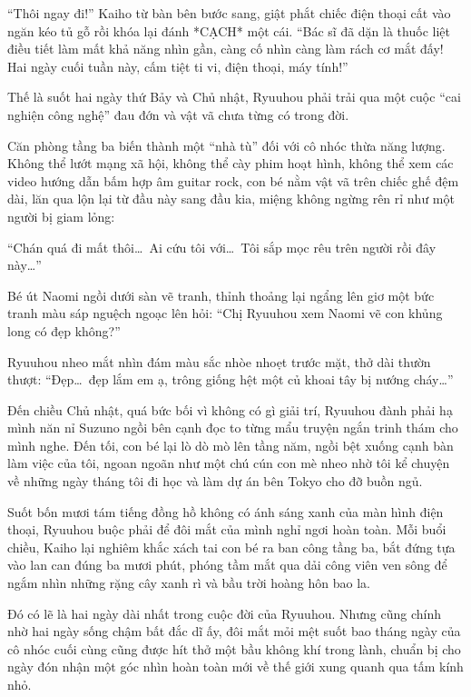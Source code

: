 ﻿\documentclass[../main.tex]{subfiles}
\begin{document}
``Thôi ngay đi!'' Kaiho từ bàn bên bước sang, giật phắt chiếc điện thoại cất vào ngăn kéo tủ gỗ rồi khóa lại đánh *CẠCH* một cái. ``Bác sĩ đã dặn là thuốc liệt điều tiết làm mất khả năng nhìn gần, càng cố nhìn càng làm rách cơ mắt đấy! Hai ngày cuối tuần này, cấm tiệt ti vi, điện thoại, máy tính!''

Thế là suốt hai ngày thứ Bảy và Chủ nhật, Ryuuhou phải trải qua một cuộc ``cai nghiện công nghệ'' đau đớn và vật vã chưa từng có trong đời.

Căn phòng tầng ba biến thành một ``nhà tù'' đối với cô nhóc thừa năng lượng. Không thể lướt mạng xã hội, không thể cày phim hoạt hình, không thể xem các video hướng dẫn bấm hợp âm guitar rock, con bé nằm vật vã trên chiếc ghế đệm dài, lăn qua lộn lại từ đầu này sang đầu kia, miệng không ngừng rên rỉ như một người bị giam lỏng:

``Chán quá đi mất thôi\dots\ Ai cứu tôi với\dots\ Tôi sắp mọc rêu trên người rồi đây này\dots''

Bé út Naomi ngồi dưới sàn vẽ tranh, thỉnh thoảng lại ngẩng lên giơ một bức tranh màu sáp nguệch ngoạc lên hỏi: ``Chị Ryuuhou xem Naomi vẽ con khủng long có đẹp không?''

Ryuuhou nheo mắt nhìn đám màu sắc nhòe nhoẹt trước mặt, thở dài thườn thượt: ``Đẹp\dots\ đẹp lắm em ạ, trông giống hệt một củ khoai tây bị nướng cháy\dots''

Đến chiều Chủ nhật, quá bức bối vì không có gì giải trí, Ryuuhou đành phải hạ mình năn nỉ Suzuno ngồi bên cạnh đọc to từng mẩu truyện ngắn trinh thám cho mình nghe. Đến tối, con bé lại lò dò mò lên tầng năm, ngồi bệt xuống cạnh bàn làm việc của tôi, ngoan ngoãn như một chú cún con mè nheo nhờ tôi kể chuyện về những ngày tháng tôi đi học và làm dự án bên Tokyo cho đỡ buồn ngủ.

Suốt bốn mươi tám tiếng đồng hồ không có ánh sáng xanh của màn hình điện thoại, Ryuuhou buộc phải để đôi mắt của mình nghỉ ngơi hoàn toàn. Mỗi buổi chiều, Kaiho lại nghiêm khắc xách tai con bé ra ban công tầng ba, bắt đứng tựa vào lan can đúng ba mươi phút, phóng tầm mắt qua dải công viên ven sông để ngắm nhìn những rặng cây xanh rì và bầu trời hoàng hôn bao la.

Đó có lẽ là hai ngày dài nhất trong cuộc đời của Ryuuhou. Nhưng cũng chính nhờ hai ngày sống chậm bất đắc dĩ ấy, đôi mắt mỏi mệt suốt bao tháng ngày của cô nhóc cuối cùng cũng được hít thở một bầu không khí trong lành, chuẩn bị cho ngày đón nhận một góc nhìn hoàn toàn mới về thế giới xung quanh qua tấm kính nhỏ.
\end{document}
